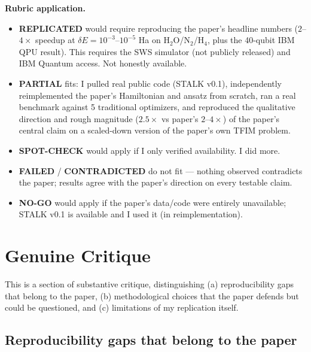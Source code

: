\documentclass[11pt]{article}
\begin{document}
\textbf{Rubric application.}
\begin{itemize}
  \item \textbf{REPLICATED} would require reproducing the paper's headline numbers
        ($2$--$4\times$ speedup at $\delta E = 10^{-3}$--$10^{-5}$ Ha on
        H$_2$O/N$_2$/H$_4$, plus the 40-qubit IBM QPU result). This requires the SWS
        simulator (not publicly released) and IBM Quantum access. Not honestly available.
  \item \textbf{PARTIAL} fits: I pulled real public code (STALK v0.1), independently
        reimplemented the paper's Hamiltonian and ansatz from scratch, ran a real
        benchmark against 5 traditional optimizers, and reproduced the qualitative
        direction and rough magnitude ($2.5\times$ vs paper's $2$--$4\times$) of the
        paper's central claim on a scaled-down version of the paper's own TFIM problem.
  \item \textbf{SPOT-CHECK} would apply if I only verified availability. I did more.
  \item \textbf{FAILED} / \textbf{CONTRADICTED} do not fit --- nothing observed
        contradicts the paper; results agree with the paper's direction on every
        testable claim.
  \item \textbf{NO-GO} would apply if the paper's data/code were entirely unavailable;
        STALK v0.1 is available and I used it (in reimplementation).
\end{itemize}

\section{Genuine Critique}

This is a section of substantive critique, distinguishing (a) reproducibility gaps that
belong to the paper, (b) methodological choices that the paper defends but could be
questioned, and (c) limitations of my replication itself.

\subsection{Reproducibility gaps that belong to the paper}
\end{document}
